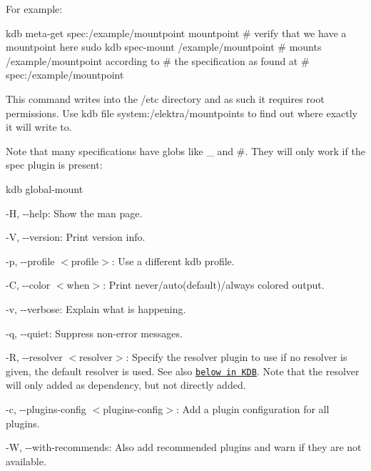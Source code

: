 For example\+:


\begin{DoxyCode}
kdb meta-get spec:/example/mountpoint mountpoint  # verify that we have a mountpoint here
sudo kdb spec-mount /example/mountpoint  # mounts /example/mountpoint according to
                                         # the specification as found at
                                         # spec:/example/mountpoint
\end{DoxyCode}


This command writes into the {\ttfamily /etc} directory and as such it requires root permissions. Use {\ttfamily kdb file system\+:/elektra/mountpoints} to find out where exactly it will write to.

Note that many specifications have globs like {\ttfamily \+\_\+} and {\ttfamily \#}. They will only work if the {\ttfamily spec} plugin is present\+:


\begin{DoxyCode}
kdb global-mount
\end{DoxyCode}



\begin{DoxyItemize}
\item {\ttfamily -\/H}, {\ttfamily -\/-\/help}\+: Show the man page.
\item {\ttfamily -\/V}, {\ttfamily -\/-\/version}\+: Print version info.
\item {\ttfamily -\/p}, {\ttfamily -\/-\/profile $<$profile$>$}\+: Use a different kdb profile.
\item {\ttfamily -\/C}, {\ttfamily -\/-\/color $<$when$>$}\+: Print never/auto(default)/always colored output.
\item {\ttfamily -\/v}, {\ttfamily -\/-\/verbose}\+: Explain what is happening.
\item {\ttfamily -\/q}, {\ttfamily -\/-\/quiet}\+: Suppress non-\/error messages.
\item {\ttfamily -\/R}, {\ttfamily -\/-\/resolver $<$resolver$>$}\+: Specify the resolver plugin to use if no resolver is given, the default resolver is used. See also \href{#KDB}{\tt below in K\+DB}. Note that the resolver will only added as dependency, but not directly added.
\item {\ttfamily -\/c}, {\ttfamily -\/-\/plugins-\/config $<$plugins-\/config$>$}\+: Add a plugin configuration for all plugins.
\item {\ttfamily -\/W}, {\ttfamily -\/-\/with-\/recommends}\+: Also add recommended plugins and warn if they are not available.
\end{DoxyItemize}


